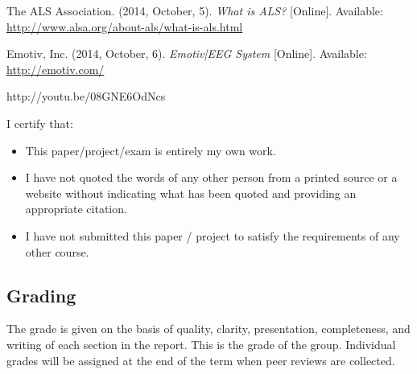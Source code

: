 \documentclass{report}
\begin{document}
\newpage
\begin{thebibliography}{1}

     The ALS Association. (2014, October, 5). \textit{What
        is ALS?} [Online]. Available:
        \url{http://www.alsa.org/about-als/what-is-als.html}
 
     Emotiv, Inc. (2014, October, 6). \textit{Emotiv|EEG
        System} [Online]. Available: \url{http://emotiv.com/}

     http://youtu.be/08GNE6OdNcs

\end{thebibliography}

\newpage
\noindent I certify that:
\begin{itemize}
\item This paper/project/exam is entirely my own work.
\item I have not quoted the words of any other person from a printed source or a website without indicating what has been quoted and providing an appropriate citation.
\item I have not submitted this paper / project to satisfy the requirements of any other course.
\end{itemize}

\vspace{1cm}
\noindent{}


\vspace{0.5cm}
\noindent{}

\vspace{0.5cm}
\noindent{}

\vspace{0.5cm}
\noindent{}

\vspace{0.5cm}
\noindent{}

\vspace{\fill}
\subsection*{Grading}
The grade is given on the basis of quality, clarity, presentation, completeness, and writing of each section in the report. This is the grade of the group. Individual grades will be assigned at the end of the term when peer reviews are collected.
\end{document}
